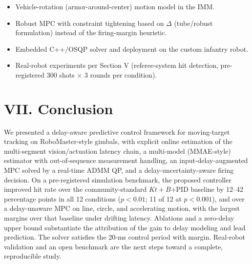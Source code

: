 \documentclass[journal]{IEEEtran}
\begin{document}
\begin{itemize}
\item Vehicle-rotation (armor-around-center) motion model in the IMM.
\item Robust MPC with constraint tightening based on $\Delta$ (tube/robust formulation) instead of the firing-margin heuristic.
\item Embedded C++/OSQP solver and deployment on the custom infantry robot.
\item Real-robot experiments per Section V (referee-system hit detection, pre-registered 300 shots $\times$ 3 rounds per condition).
\end{itemize}




\section*{VII. Conclusion}

We presented a delay-aware predictive control framework for moving-target tracking on RoboMaster-style gimbals, with explicit online estimation of the multi-segment vision/actuation latency chain, a multi-model (MMAE-style) estimator with out-of-sequence measurement handling, an input-delay-augmented MPC solved by a real-time ADMM QP, and a delay-uncertainty-aware firing decision. On a pre-registered simulation benchmark, the proposed controller improved hit rate over the community-standard $Kt+B$+PID baseline by 12--42 percentage points in all 12 conditions ($p<0.01$; 11 of 12 at $p<0.001$), and over a delay-unaware MPC on line, circle, and accelerating motion, with the largest margins over that baseline under drifting latency. Ablations and a zero-delay upper bound substantiate the attribution of the gain to delay modeling and lead prediction. The solver satisfies the 20-ms control period with margin. Real-robot validation and an open benchmark are the next steps toward a complete, reproducible study.


\end{document}
